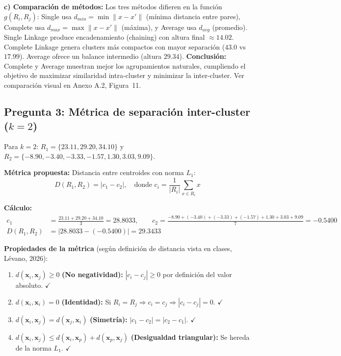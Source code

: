 \documentclass[10pt,a4paper]{article}
\begin{document}
\textbf{c) Comparación de métodos:} Los tres métodos difieren en la función $g(R_i, R_j)$: Single usa $d_{min} = \min \|x - x'\|$ (mínima distancia entre pares), Complete usa $d_{max} = \max \|x - x'\|$ (máxima), y Average usa $d_{avg}$ (promedio). Single Linkage produce encadenamiento (chaining) con altura final $\approx 14.02$. Complete Linkage genera clusters más compactos con mayor separación ($43.0$ vs $17.99$). Average ofrece un balance intermedio (altura $29.34$). \textbf{Conclusión:} Complete y Average muestran mejor los agrupamientos naturales, cumpliendo el objetivo de maximizar similaridad intra-cluster y minimizar la inter-cluster. Ver comparación visual en Anexo A.2, Figura~11.

\subsection{Pregunta 3: Métrica de separación inter-cluster ($k=2$)}

Para $k=2$: $R_1 = \{23.11, 29.20, 34.10\}$ y $R_2 = \{-8.90, -3.40, -3.33, -1.57, 1.30, 3.03, 9.09\}$.

\textbf{Métrica propuesta:} Distancia entre centroides con norma $L_1$:
\begin{equation}
D(R_1, R_2) = |c_1 - c_2|, \quad \text{donde } c_i = \frac{1}{|R_i|} \sum_{x \in R_i} x
\end{equation}

\textbf{Cálculo:}
\begin{align}
c_1 &= \frac{23.11 + 29.20 + 34.10}{3} = 28.8033, \qquad
c_2 = \frac{-8.90 + (-3.40) + (-3.33) + (-1.57) + 1.30 + 3.03 + 9.09}{7} = -0.5400 \\
D(R_1, R_2) &= |28.8033 - (-0.5400)| = \boxed{29.3433}
\end{align}

\textbf{Propiedades de la métrica} (según definición de distancia vista en clases, Lévano, 2026):

\begin{enumerate}[leftmargin=1.2cm, itemsep=1pt]
  \item $d(\mathbf{x}_i, \mathbf{x}_j) \geq 0$ \textbf{(No negatividad):} $|c_i - c_j| \geq 0$ por definición del valor absoluto. $\checkmark$
  \item $d(\mathbf{x}_i, \mathbf{x}_i) = 0$ \textbf{(Identidad):} Si $R_i = R_j \Rightarrow c_i = c_j \Rightarrow |c_i - c_j| = 0$. $\checkmark$
  \item $d(\mathbf{x}_i, \mathbf{x}_j) = d(\mathbf{x}_j, \mathbf{x}_i)$ \textbf{(Simetría):} $|c_1 - c_2| = |c_2 - c_1|$. $\checkmark$
  \item $d(\mathbf{x}_i, \mathbf{x}_j) \leq d(\mathbf{x}_i, \mathbf{x}_p) + d(\mathbf{x}_p, \mathbf{x}_j)$ \textbf{(Desigualdad triangular):} Se hereda de la norma $L_1$. $\checkmark$
\end{enumerate}
\end{document}
